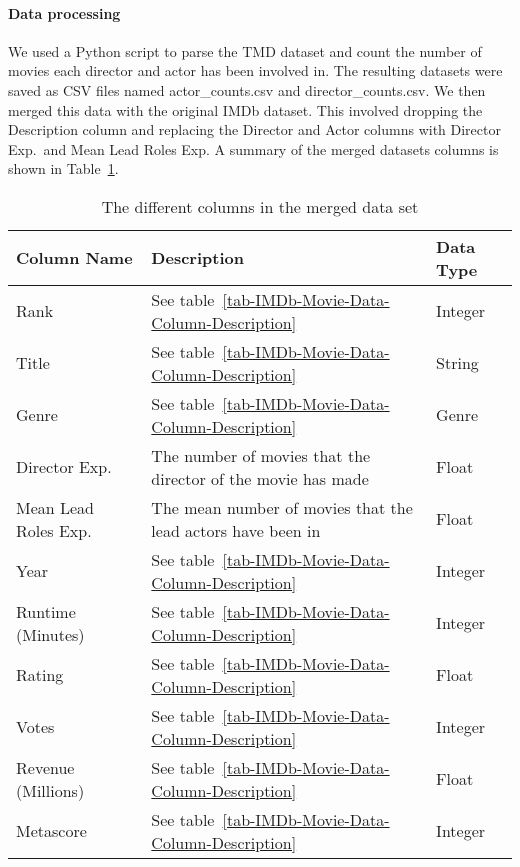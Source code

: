     \paragraph{Data processing}
        We used a Python script to parse the TMD dataset and count the number of movies
            each director and actor has been involved in.
        The resulting datasets were saved as CSV files named actor\_counts.csv and
            director\_counts.csv.
        We then merged this data with the original IMDb dataset.
        This involved dropping the Description column and replacing the Director and
            Actor columns with Director Exp.~and Mean Lead Roles Exp.
        A summary of the merged datasets columns is shown in
            Table~\ref{tab-merged-data-column-description}.

        \begin{table}[h]
            \begin{tabular}{lp{9cm}l}
                \toprule
                Column Name           & Description                                                  & Data Type \\
                \midrule
                Rank                  & See table~\ref{tab-IMDb-Movie-Data-Column-Description}       & Integer   \\
                Title                 & See table~\ref{tab-IMDb-Movie-Data-Column-Description}       & String    \\
                Genre                 & See table~\ref{tab-IMDb-Movie-Data-Column-Description}       & Genre     \\
                Director Exp.~        & The number of movies that the director of the movie has made & Float     \\
                Mean Lead Roles Exp.~ & The mean number of movies that the lead actors have been in  & Float     \\
                Year                  & See table~\ref{tab-IMDb-Movie-Data-Column-Description}       & Integer   \\
                Runtime (Minutes)     & See table~\ref{tab-IMDb-Movie-Data-Column-Description}       & Integer   \\
                Rating                & See table~\ref{tab-IMDb-Movie-Data-Column-Description}       & Float     \\
                Votes                 & See table~\ref{tab-IMDb-Movie-Data-Column-Description}       & Integer   \\
                Revenue (Millions)    & See table~\ref{tab-IMDb-Movie-Data-Column-Description}       & Float     \\
                Metascore             & See table~\ref{tab-IMDb-Movie-Data-Column-Description}       & Integer   \\
                \bottomrule
            \end{tabular}
            \caption[short]{The different columns in the merged data set}\label{tab-merged-data-column-description}
        \end{table}

